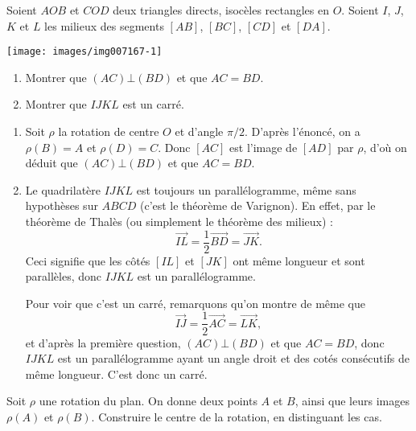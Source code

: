 \begin{exo} %
Soient $AOB$ et $COD$ deux triangles directs, isocèles rectangles en $O$. Soient $I$, $J$, $K$ et $L$ les milieux des segments $[AB]$, $[BC]$, $[CD]$ et $[DA]$.
\begin{center}
\texttt{[image: images/img007167-1]}
\end{center}
\begin{enumerate}
\item Montrer que $(AC)\bot (BD)$ et que $AC=BD$.
\item Montrer que $IJKL$ est un carré. 
\end{enumerate}


\begin{sol}
\begin{enumerate}
\item Soit $\rho$ la rotation de centre $O$ et d'angle $\pi/2$. D'après l'énoncé, on a $\rho(B)=A$ et $\rho(D)=C$. Donc $[AC]$ est l'image de $[AD]$ par $\rho$, d'où on déduit que $(AC)\bot (BD)$ et que $AC=BD$.

\item Le quadrilatère $IJKL$ est toujours un parallélogramme, même sans hypothèses sur $ABCD$ (c'est le théorème de Varignon). En effet, par le théorème de Thalès (ou simplement le théorème des milieux) : 
\[ \overrightarrow{IL} = \frac12 \overrightarrow{BD} = \overrightarrow{JK}.\]
Ceci signifie que les côtés $[IL]$ et $[JK]$ ont même longueur et sont parallèles, donc $IJKL$ est un parallélogramme.

Pour voir que c'est un carré, remarquons qu'on montre de même que  
\[ \overrightarrow{IJ} = \frac12 \overrightarrow{AC} = \overrightarrow{LK},\]
et d'après la première question, $(AC)\bot (BD)$ et que $AC=BD$, donc $IJKL$ est un parallélogramme ayant un angle droit et des cotés consécutifs de même longueur. C'est donc un carré.
\end{enumerate}
\end{sol}
\end{exo}


\begin{exo}
Soit $\rho$ une rotation du plan. On donne deux points $A$ et $B$, ainsi que leurs images $\rho(A)$ et $\rho(B)$. Construire le centre de la rotation, en distinguant les cas.
\end{exo}

